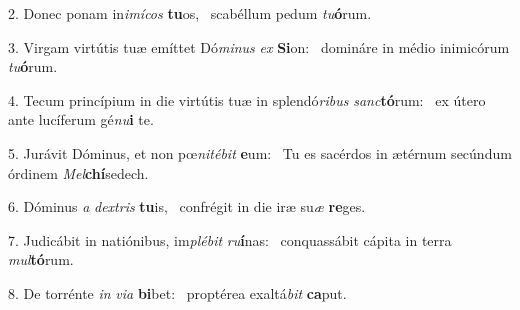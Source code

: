 2. Donec ponam in\textit{i}\textit{mí}\textit{cos} \textbf{tu}os, \ast\  scabéllum pedum \textit{tu}\textbf{ó}rum.\

3. Virgam virtútis tuæ emíttet Dó\textit{mi}\textit{nus} \textit{ex} \textbf{Si}on: \ast\  domináre in médio inimicórum \textit{tu}\textbf{ó}rum.\

4. Tecum princípium in die virtútis tuæ in splendó\textit{ri}\textit{bus} \textit{sanc}\textbf{tó}rum: \ast\  ex útero ante lucíferum gé\textit{nu}\textbf{i} te.\

5. Jurávit Dóminus, et non pœ\textit{ni}\textit{té}\textit{bit} \textbf{e}um: \ast\  Tu es sacérdos in ætérnum secúndum órdinem \textit{Mel}\textbf{chí}sedech.\

6. Dóminus \textit{a} \textit{dex}\textit{tris} \textbf{tu}is, \ast\  confrégit in die iræ su\textit{æ} \textbf{re}ges.\

7. Judicábit in natiónibus, im\textit{plé}\textit{bit} \textit{ru}\textbf{í}nas: \ast\  conquassábit cápita in terra \textit{mul}\textbf{tó}rum.\

8. De torrénte \textit{in} \textit{vi}\textit{a} \textbf{bi}bet: \ast\  proptérea exaltá\textit{bit} \textbf{ca}put.\


